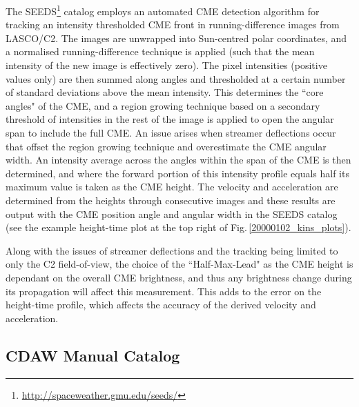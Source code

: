 \documentclass[referee,a4paper,12pt,traditabstract]{swsc}
\begin{document}
\begin{linenumbers}
The SEEDS\footnote{\href{http://spaceweather.gmu.edu/seeds/}{http://spaceweather.gmu.edu/seeds/}} catalog employs an automated CME detection algorithm for tracking an intensity thresholded CME front in running-difference images from LASCO/C2. The images are unwrapped into Sun-centred polar coordinates, and a normalised running-difference technique is applied (such that the mean intensity of the new image is effectively zero). The pixel intensities (positive values only) are then summed along angles and thresholded at a certain number of standard deviations above the mean intensity. This determines the ``core angles" of the CME, and a region growing technique based on a secondary threshold of intensities in the rest of the image is applied to open the angular span to include the full CME. An issue arises when streamer deflections occur that offset the region growing technique and overestimate the CME angular width. An intensity average across the angles within the span of the CME is then determined, and where the forward portion of this intensity profile equals half its maximum value is taken as the CME height. The velocity and acceleration are determined from the heights through consecutive images and these results are output with the CME position angle and angular width in the SEEDS catalog (see the example height-time plot at the top right of Fig.\,\ref{20000102_kins_plots}).

Along with the issues of streamer deflections and the tracking being limited to only the C2 field-of-view, the choice of the ``Half-Max-Lead" as the CME height is dependant on the overall CME brightness, and thus any brightness change during its propagation will affect this measurement. This adds to the error on the height-time profile, which affects the accuracy of the derived velocity and acceleration.

\subsection{CDAW Manual Catalog}


\end{linenumbers}
\end{document}
